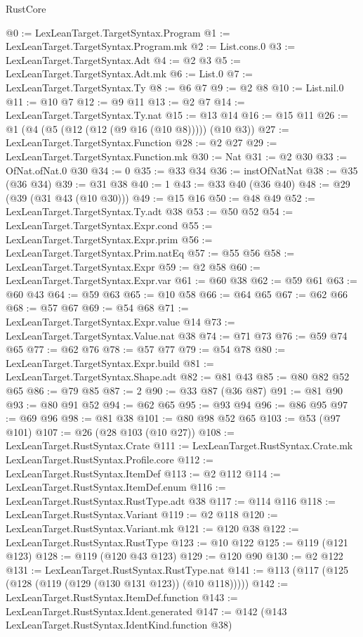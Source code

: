 \begin{lexlean}{RustCore}
\begin{coremodule}
@0 := LexLeanTarget.TargetSyntax.Program
@1 := LexLeanTarget.TargetSyntax.Program.mk
@2 := List.cons.{0}
@3 := LexLeanTarget.TargetSyntax.Adt
@4 := @2 @3
@5 := LexLeanTarget.TargetSyntax.Adt.mk
@6 := List.{0}
@7 := LexLeanTarget.TargetSyntax.Ty
@8 := @6 @7
@9 := @2 @8
@10 := List.nil.{0}
@11 := @10 @7
@12 := @9 @11
@13 := @2 @7
@14 := LexLeanTarget.TargetSyntax.Ty.nat
@15 := @13 @14
@16 := @15 @11
@26 := @1 (@4 (@5 (@12 (@12 (@9 @16 (@10 @8))))) (@10 @3))
@27 := LexLeanTarget.TargetSyntax.Function
@28 := @2 @27
@29 := LexLeanTarget.TargetSyntax.Function.mk
@30 := Nat
@31 := @2 @30
@33 := OfNat.ofNat.{0} @30
@34 := 0
@35 := @33 @34
@36 := instOfNatNat
@38 := @35 (@36 @34)
@39 := @31 @38
@40 := 1
@43 := @33 @40 (@36 @40)
@48 := @29 (@39 (@31 @43 (@10 @30)))
@49 := @15 @16
@50 := @48 @49
@52 := LexLeanTarget.TargetSyntax.Ty.adt @38
@53 := @50 @52
@54 := LexLeanTarget.TargetSyntax.Expr.cond
@55 := LexLeanTarget.TargetSyntax.Expr.prim
@56 := LexLeanTarget.TargetSyntax.Prim.natEq
@57 := @55 @56
@58 := LexLeanTarget.TargetSyntax.Expr
@59 := @2 @58
@60 := LexLeanTarget.TargetSyntax.Expr.var
@61 := @60 @38
@62 := @59 @61
@63 := @60 @43
@64 := @59 @63
@65 := @10 @58
@66 := @64 @65
@67 := @62 @66
@68 := @57 @67
@69 := @54 @68
@71 := LexLeanTarget.TargetSyntax.Expr.value @14
@73 := LexLeanTarget.TargetSyntax.Value.nat @38
@74 := @71 @73
@76 := @59 @74 @65
@77 := @62 @76
@78 := @57 @77
@79 := @54 @78
@80 := LexLeanTarget.TargetSyntax.Expr.build
@81 := LexLeanTarget.TargetSyntax.Shape.adt
@82 := @81 @43
@85 := @80 @82 @52 @65
@86 := @79 @85
@87 := 2
@90 := @33 @87 (@36 @87)
@91 := @81 @90
@93 := @80 @91 @52
@94 := @62 @65
@95 := @93 @94
@96 := @86 @95
@97 := @69 @96
@98 := @81 @38
@101 := @80 @98 @52 @65
@103 := @53 (@97 @101)
@107 := @26 (@28 @103 (@10 @27))
@108 := LexLeanTarget.RustSyntax.Crate
@111 := LexLeanTarget.RustSyntax.Crate.mk LexLeanTarget.RustSyntax.Profile.core
@112 := LexLeanTarget.RustSyntax.ItemDef
@113 := @2 @112
@114 := LexLeanTarget.RustSyntax.ItemDef.enum
@116 := LexLeanTarget.RustSyntax.RustType.adt @38
@117 := @114 @116
@118 := LexLeanTarget.RustSyntax.Variant
@119 := @2 @118
@120 := LexLeanTarget.RustSyntax.Variant.mk
@121 := @120 @38
@122 := LexLeanTarget.RustSyntax.RustType
@123 := @10 @122
@125 := @119 (@121 @123)
@128 := @119 (@120 @43 @123)
@129 := @120 @90
@130 := @2 @122
@131 := LexLeanTarget.RustSyntax.RustType.nat
@141 := @113 (@117 (@125 (@128 (@119 (@129 (@130 @131 @123)) (@10 @118)))))
@142 := LexLeanTarget.RustSyntax.ItemDef.function
@143 := LexLeanTarget.RustSyntax.Ident.generated
@147 := @142 (@143 LexLeanTarget.RustSyntax.IdentKind.function @38)

\end{coremodule}
\end{lexlean}
